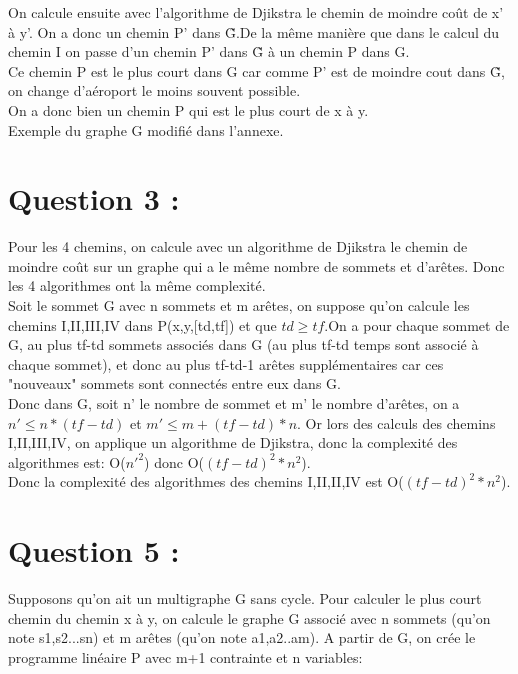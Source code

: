 \documentclass{article}
\begin{document}
On calcule ensuite avec l'algorithme de Djikstra le chemin de moindre coût de x' à y'. On a donc un chemin P' dans \~G.De la même manière que dans le calcul du chemin I on passe d'un chemin P' dans \~G à un chemin P dans G.\\

Ce chemin P est le plus court dans G car comme P' est de moindre cout dans \~G, on change d'aéroport le moins souvent possible.\\

On a donc bien un chemin P qui est le plus court de x à y.\\
Exemple du graphe G modifié dans l'annexe.
\section*{Question 3 :}
Pour les 4 chemins, on calcule avec un algorithme de Djikstra le chemin de moindre coût sur un graphe qui a le même nombre de sommets et d'arêtes. Donc les 4 algorithmes ont la même complexité.\\

Soit le sommet G avec n sommets et m arêtes, on suppose qu'on calcule les chemins I,II,III,IV dans P(x,y,[td,tf]) et que $ td \geq tf $.On a pour chaque sommet de G, au plus tf-td sommets associés dans \tild G (au plus tf-td temps sont associé à chaque sommet), et donc au plus tf-td-1 arêtes supplémentaires car ces "nouveaux" sommets sont connectés entre eux dans \tild G.\\

Donc dans \tild G, soit n' le nombre de sommet et m' le nombre d'arêtes, on a $ n' \leq n*(tf-td) $ et $ m' \leq m+(tf-td)*n $. Or lors des calculs des chemins I,II,III,IV, on applique un algorithme de Djikstra, donc la complexité des algorithmes est: O($ n'^2 $) donc O($ (tf-td)^{2}*n^{2} $).\\

Donc la complexité des algorithmes des chemins I,II,II,IV est O($ (tf-td)^{2}*n^{2} $).
\section*{Question 5 :}

Supposons qu'on ait un multigraphe G sans cycle. Pour calculer le plus court chemin du chemin x à y, on calcule le graphe \tild G associé avec n sommets (qu'on note s1,s2...sn) et m arêtes (qu'on note a1,a2..am).
A partir de \tild G, on crée le programme linéaire P avec m+1 contrainte et n variables:\\
\end{document}
